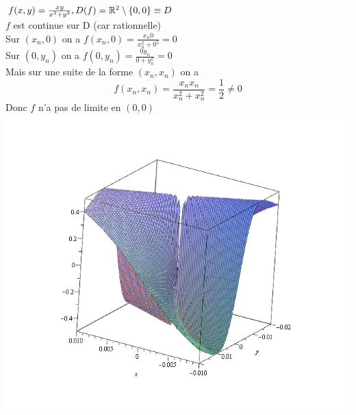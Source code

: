 \documentclass[12pt,a4paper]{article}
\begin{document}
\\
$f(x,y) = \frac{xy}{x^2+y^2}, D(f) = \mathbb{R}^2\setminus \{0,0\} \equiv D$\\
$f$ est continue sur D (car rationnelle)\\
Sur $(x_n,0)$ on a $f(x_n,0) = \frac{x_n 0}{x_n^2 + 0^2} = 0$\\
Sur $(0,y_n)$ on a $f(0,y_n) = \frac{0 y_n}{0+y_n^2} = 0$\\
Mais sur une suite de la forme $(x_n,x_n)$ on a 
\begin{equation*}
	f(x_n,x_n) = \frac{x_n x_n}{x_n^2+x_n^2} = \frac{1}{2} \neq 0
\end{equation*}
Donc $f$ n'a pas de limite en $(0,0)$\\
\includegraphics[scale=0.3]{images/sanslimite}
\end{document}
